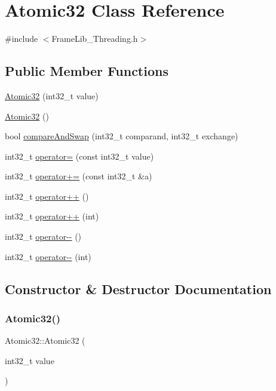 \hypertarget{class_atomic32}{}\section{Atomic32 Class Reference}
\label{class_atomic32}


{\ttfamily \#include $<$Frame\+Lib\+\_\+\+Threading.\+h$>$}

\subsection*{Public Member Functions}
\begin{DoxyCompactItemize}
\item 
\hyperlink{class_atomic32_a2f4bd49dda1e79d59618309c7823ddad}{Atomic32} (int32\+\_\+t value)
\item 
\hyperlink{class_atomic32_a34f5641dfe5bfd1eb7dedf3c81e21798}{Atomic32} ()
\item 
bool \hyperlink{class_atomic32_a00fe115c7138497ce5d7de9001b3166f}{compare\+And\+Swap} (int32\+\_\+t comparand, int32\+\_\+t exchange)
\item 
int32\+\_\+t \hyperlink{class_atomic32_a73e8f378cbe329c11f9f954a3a1c13e4}{operator=} (const int32\+\_\+t value)
\item 
int32\+\_\+t \hyperlink{class_atomic32_a73b03eb7fb83b21ea4e20aa23240d561}{operator+=} (const int32\+\_\+t \&a)
\item 
int32\+\_\+t \hyperlink{class_atomic32_a65db178dc93ef4f57535a9eecbab0046}{operator++} ()
\item 
int32\+\_\+t \hyperlink{class_atomic32_af2dc3e0a460597f69526c8b32d483f30}{operator++} (int)
\item 
int32\+\_\+t \hyperlink{class_atomic32_a038730a76fcb5108d0909956fd55dbf2}{operator-\/-\/} ()
\item 
int32\+\_\+t \hyperlink{class_atomic32_a883b83394f9fa838afaa0acebc3ec4c9}{operator-\/-\/} (int)
\end{DoxyCompactItemize}


\subsection{Constructor \& Destructor Documentation}
\mbox{\label{class_atomic32_a2f4bd49dda1e79d59618309c7823ddad}} 
\subsubsection{\texorpdfstring{Atomic32()}{Atomic32()}\hspace{0.1cm}{\footnotesize\ttfamily [1/2]}}
{\footnotesize\ttfamily Atomic32\+::\+Atomic32 (\begin{DoxyParamCaption}\item[{int32\+\_\+t}]{value }\end{DoxyParamCaption})\hspace{0.3cm}{\ttfamily [inline]}}

